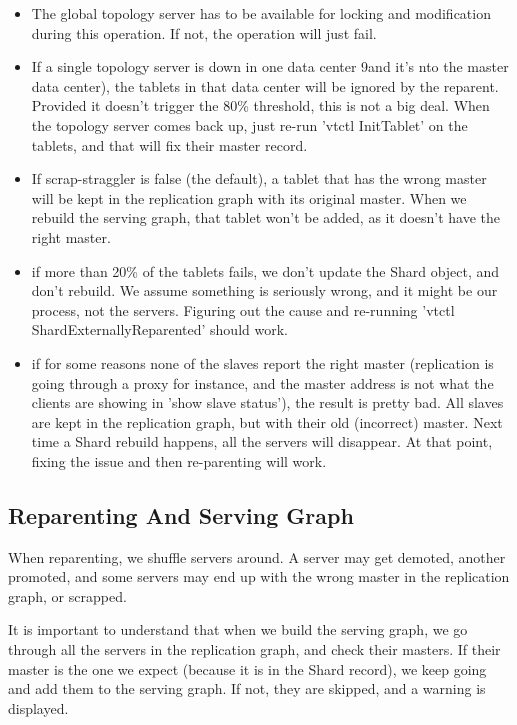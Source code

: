 \begin{itemize}
\item The global topology server has to be available for locking and modification during this operation. If not, the operation will just fail.
\item If a single topology server is down in one data center 9and it's nto the master data center), the tablets in that data center will be ignored by the reparent. Provided it doesn't trigger the 80\% threshold, this is not a big deal. When the topology server comes back up, just re-run 'vtctl InitTablet' on the tablets, and that will fix their master record.
\item If scrap-straggler is false (the default), a tablet that has the wrong master will be kept in the replication graph with its original master. When we rebuild the serving graph, that tablet won't be added, as it doesn't have the right master.
\item if more than 20\% of the tablets fails, we don't update the Shard object, and don't rebuild. We assume something is seriously wrong, and it might be our process, not the servers. Figuring out the cause and re-running 'vtctl ShardExternallyReparented' should work.
\item if for some reasons none of the slaves report the right master (replication is going through a proxy for instance, and the master address is not what the clients are showing in 'show slave status'), the result is pretty bad. All slaves are kept in the replication graph, but with their old (incorrect) master. Next time a Shard rebuild happens, all the servers will disappear. At that point, fixing the issue and then re-parenting will work.
\end{itemize}
\subsection{Reparenting And Serving Graph}\hypertarget{reparenting-and-serving-graph}{}\label{reparenting-and-serving-graph}

When reparenting, we shuffle servers around. A server may get demoted, another promoted, and some servers may end up with the wrong master in the replication graph, or scrapped.

It is important to understand that when we build the serving graph, we go through all the servers in the replication graph, and check their masters. If their master is the one we expect (because it is in the Shard record), we keep going and add them to the serving graph. If not, they are skipped, and a warning is displayed.

